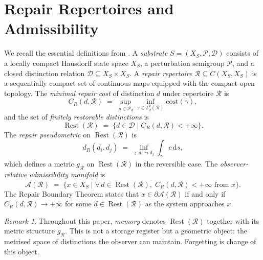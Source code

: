 \documentclass[12pt, oneside]{article}
\theoremstyle{plain}
\theoremstyle{definition}
\theoremstyle{remark}
\newtheorem{remark}[theorem]{Remark}
\DeclareMathOperator{\Rest}{Rest}
\newcommand{\CR}{C_{\!R}}
\newcommand{\AO}{\mathcal{A}}
\newcommand{\Dsub}{\mathcal{D}}
\newcommand{\Xsub}{X_S}
\begin{document}
\section{Repair Repertoires and Admissibility}
\label{sec:repair}

We recall the essential definitions from \cite{Flyxion2026a}.
A \emph{substrate} $S = (\Xsub, \mathcal{P}, \Dsub)$ consists of a
locally compact Hausdorff state space $\Xsub$, a perturbation
semigroup $\mathcal{P}$, and a closed distinction relation
$\Dsub \subseteq \Xsub \times \Xsub$.
A \emph{repair repertoire} $\mathcal{R} \subseteq C(\Xsub, \Xsub)$
is a sequentially compact set of continuous maps equipped with the
compact-open topology.
The \emph{minimal repair cost} of distinction $d$ under repertoire
$\mathcal{R}$ is
\[
  \CR(d, \mathcal{R})
  \;=\;
  \sup_{p \in \mathcal{P}_d}
  \inf_{\gamma \in \Gamma_d^p(\mathcal{R})}
  \mathrm{cost}(\gamma),
\]
and the set of \emph{finitely restorable distinctions} is
\[
  \Rest(\mathcal{R})
  \;=\;
  \bigl\{d \in \Dsub \;\big|\; \CR(d, \mathcal{R}) < +\infty\bigr\}.
\]
The \emph{repair pseudometric} on $\Rest(\mathcal{R})$ is
\[
  d_R(d_i, d_j)
  \;=\;
  \inf_{\gamma : d_i \leadsto d_j}
  \int_\gamma c\, \mathrm{d}s,
\]
which defines a metric $g_{\mathcal{R}}$ on $\Rest(\mathcal{R})$
in the reversible case.
The \emph{observer-relative admissibility manifold} is
\[
  \AO(\mathcal{R})
  \;=\;
  \overline{\bigl\{
    x \in \Xsub \;\big|\;
    \forall\, d \in \Rest(\mathcal{R}),\;
    \CR(d, \mathcal{R}) < +\infty \text{ from } x
  \bigr\}}.
\]
The Repair Boundary Theorem \cite{Flyxion2026a} states that
$x \in \partial\AO(\mathcal{R})$ if and only if
$\CR(d, \mathcal{R}) \to +\infty$ for some $d \in \Rest(\mathcal{R})$
as the system approaches $x$.

\begin{remark}
  Throughout this paper, \emph{memory} denotes $\Rest(\mathcal{R})$
  together with its metric structure $g_{\mathcal{R}}$.
  This is not a storage register but a geometric object: the
  metrised space of distinctions the observer can maintain.
  Forgetting is change of this object.
\end{remark}
\end{document}
